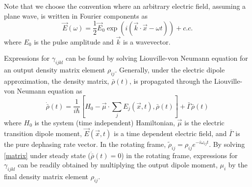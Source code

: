 \documentclass[aip, jcp, draft, onecolumn]{revtex4-2}
\begin{document}
Note that we choose the convention where an arbitrary electric field, assuming a plane wave, is written in Fourier components as 
\begin{equation}
	\vec{E}(\omega) = \frac{1}{2} \vec{E}_0 \exp(i(\vec{k}\cdot\vec{x} - \omega t)) + c.c.
\end{equation}
where $E_0$ is the pulse amplitude and $\vec{k}$ is a wavevector.


Expressions for $\gamma_{ijkl}$ can be found by solving Liouville-von Neumann equation for an output density matrix element $\rho_{ij}$.
Generally, under the electric dipole approximation, the density matrix, $\bar{\rho}(t)$, is propagated through the Liouville-von Neumann equation as \cite{RN455}
\begin{equation}\label{matrix}
	\dot{\bar{\rho}}(t) = \frac{1}{i \hbar}[H_0 - \vec{\mu}\cdot \sum_j E_j(\vec{x},t), \bar{\rho}(t)] + \bar{\Gamma} \bar{\rho}(t)
\end{equation} %
where $H_0$ is the system (time independent) Hamiltonian, $\vec{\mu}$ is the electric transition dipole moment, $\vec{E}(\vec{x},t)$ is a time dependent electric field, and $\bar{\Gamma}$ is the pure dephasing rate vector. 
In the rotating frame, $\tilde{\rho}_{ij} = \rho_{ij} e^{-i \omega_{ij}t}$.
By solving \autoref{matrix} under steady state ($\dot{\bar{\rho}}(t) = 0$) in the rotating frame, expressions for $\gamma_{ijkl}$ can be readily obtained by multiplying the output dipole moment, $\mu_i$ by the final density matrix element $\rho_{ij}$. 
\end{document}

